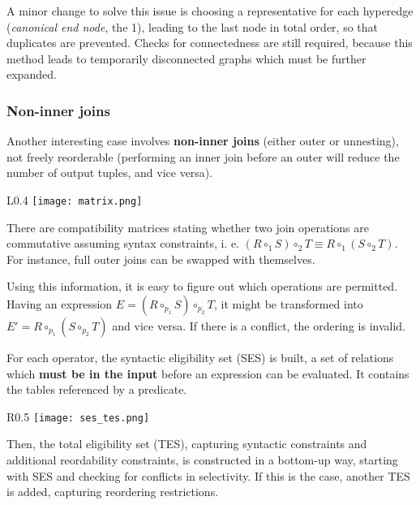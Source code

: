 A minor change to solve this issue is choosing a representative for each hyperedge (\textit{canonical end node}, the 1), leading to the last node in total order, so that duplicates are prevented. Checks for connectedness are still required, because this method leads to temporarily disconnected graphs which must be further expanded.

\subsubsection{Non-inner joins}
Another interesting case involves \textbf{non-inner joins} (either outer or unnesting), not freely reorderable (performing an inner join before an outer will reduce the number of output tuples, and vice versa). 

\begin{wrapfigure}{L}{0.4\textwidth}
	\vspace{-15pt}
	\texttt{[image: matrix.png]}
	\vspace{-35pt}
\end{wrapfigure}

There are compatibility matrices stating whether two join operations are commutative assuming syntax constraints, i. e. $(R \circ_1 S) \circ_2 T \equiv R \circ_1 (S \circ_2 T)$. For instance, full outer joins can be swapped with themselves. 

Using this information, it is easy to figure out which operations are permitted. Having an expression $E = (R \circ_{p_1} S) \circ_{p_2} T$, it might be transformed into $E' = R \circ_{p_1} (S \circ_{p_2} T)$ and vice versa. If there is a conflict, the ordering is invalid. 

For each operator, the syntactic eligibility set (SES) is built, a set of relations which \textbf{must be in the input} before an expression can be evaluated. It contains the tables referenced by a predicate.

\begin{wrapfigure}{R}{0.5\textwidth}
	\vspace{-5pt}
	\texttt{[image: ses\_tes.png]}
	\vspace{-35pt}
\end{wrapfigure}

Then, the total eligibility set (TES), capturing syntactic constraints and additional reordability constraints, is constructed in a bottom-up way, starting with SES and checking for conflicts in selectivity. If this is the case, another TES is added, capturing reordering restrictions. 

